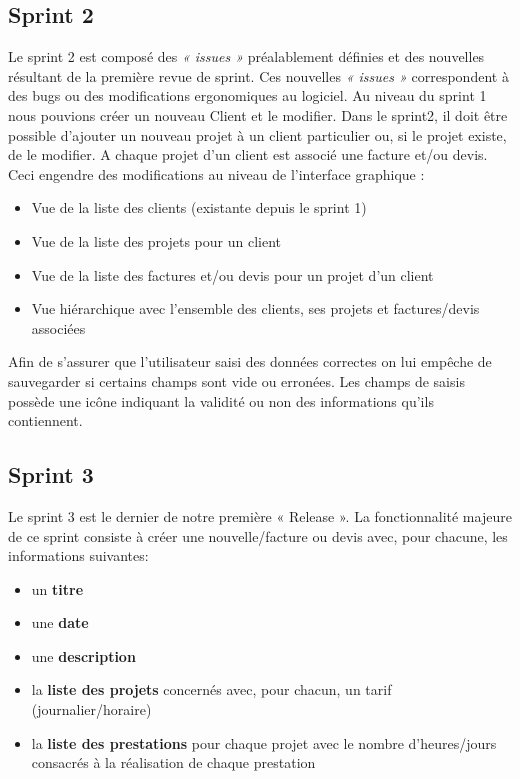 \documentclass[12pt,a4paper,openany]{article}
\begin{document}
	\subsection{Sprint 2}
	Le sprint 2 est composé des \textit{« issues »} préalablement définies et des nouvelles résultant de la première revue de sprint. Ces nouvelles \textit{« issues »} correspondent à des bugs ou des modifications ergonomiques au logiciel. 
	Au niveau du sprint 1 nous pouvions créer un nouveau Client et le modifier. Dans le sprint2, il doit être possible d'ajouter un nouveau projet à un client particulier ou, si le projet existe, de le modifier. A chaque projet d'un client est associé une facture et/ou devis. Ceci engendre des modifications au niveau de l'interface graphique :
	\begin{itemize}
		\item Vue de la liste des clients (existante depuis le sprint 1)
		\item Vue de la liste des projets pour un client
		\item Vue de la liste des factures et/ou devis pour un projet d'un client
		\item Vue hiérarchique avec l'ensemble des clients, ses projets et factures/devis associées
	\end{itemize}
	Afin de s'assurer que l'utilisateur saisi des données correctes on lui empêche de sauvegarder si certains champs sont vide ou erronées. Les champs de saisis possède une icône indiquant la validité ou non des informations qu'ils contiennent. 
	
	\subsection{Sprint 3}
	Le sprint 3 est le dernier de notre première « Release ». La fonctionnalité majeure de ce sprint consiste à créer une nouvelle/facture ou devis avec, pour chacune, les informations suivantes:

	\begin{itemize}
		\item un \textbf{titre}
		\item une \textbf{date}
		\item une \textbf{description}
		\item la \textbf{liste des projets} concernés avec, pour chacun, un tarif (journalier/horaire)
		\item la \textbf{liste des prestations} pour chaque projet avec le nombre d'heures/jours consacrés à la réalisation de chaque prestation
	\end{itemize}
	
\end{document}
